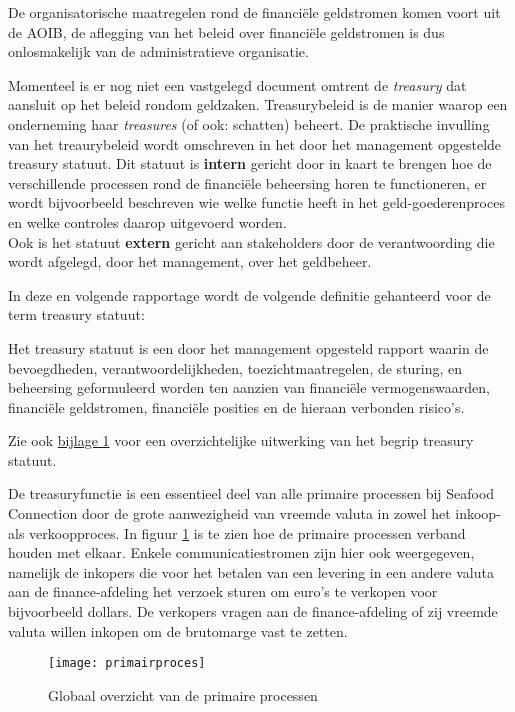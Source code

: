 De organisatorische maatregelen rond de financiële geldstromen komen voort uit de AOIB, de aflegging van het beleid over financiële geldstromen is dus onlosmakelijk van de administratieve organisatie. 

Momenteel is er nog niet een vastgelegd document omtrent de \textit{treasury} dat aansluit op het beleid rondom geldzaken. Treasurybeleid is de manier waarop een onderneming haar \textit{treasures} (of ook: schatten) beheert. De praktische invulling van het treaurybeleid wordt omschreven in het door het management opgestelde treasury statuut. 
Dit statuut is \textbf{intern} gericht door in kaart te brengen hoe de verschillende processen rond de financiële beheersing horen te functioneren, er wordt bijvoorbeeld beschreven wie welke functie heeft in het geld-goederenproces en welke controles daarop uitgevoerd worden. \\
Ook is het statuut \textbf{extern} gericht aan stakeholders door de verantwoording die wordt afgelegd, door het management, over het geldbeheer. \citep{jans}

In deze en volgende rapportage wordt de volgende definitie gehanteerd voor de term treasury statuut: 

\begin{displayquote}
Het treasury statuut is een door het management opgesteld rapport waarin de bevoegdheden, verantwoordelijkheden, toezichtmaatregelen, de sturing, en beheersing geformuleerd worden ten aanzien van financiële vermogenswaarden, financiële geldstromen, financiële posities en de hieraan verbonden risico’s. \\
\citep{jans,buunk} \label{def:treasury}
\end{displayquote}
\noindent
Zie ook \hyperlink{bij:treasury}{bijlage 1} voor een overzichtelijke uitwerking van het begrip treasury statuut.

\bigskip
De treasuryfunctie is een essentieel deel van alle primaire processen bij Seafood Connection door de grote aanwezigheid van vreemde valuta in zowel het inkoop- als verkoopproces. In figuur \ref{fig:primairproces} is te zien hoe de primaire processen verband houden met elkaar. Enkele communicatiestromen zijn hier ook weergegeven, namelijk de inkopers die voor het betalen van een levering in een andere valuta aan de finance-afdeling het verzoek sturen om euro's te verkopen voor bijvoorbeeld dollars. De verkopers vragen aan de finance-afdeling of zij vreemde valuta willen inkopen om de brutomarge vast te zetten.

\begin{figure}[!hb]
    \centering
    \texttt{[image: primairproces]}
    \caption{Globaal overzicht van de primaire processen}
    \label{fig:primairproces}
\end{figure}


